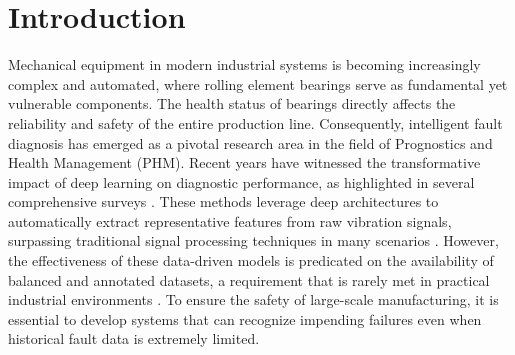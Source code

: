 \begin{abstract}
Rolling element bearings are critical components in industrial machinery, and their failure can lead to catastrophic system breakdowns. While deep learning has significantly advanced fault diagnosis, the performance of these models is often hampered by the class imbalance problem, where fault samples are scarce compared to normal data. To address this challenge, this paper proposes a novel framework termed CAC-CycleGAN-WGP for imbalanced bearing fault diagnosis. The methodological core involves a CycleGAN architecture that transforms normal vibration signals into realistic fault signals, integrated with a Conditional Auxiliary Classifier (CAC) to accurately capture the marginal probability distributions of various fault categories. To ensure training stability and suppress mode collapse, we incorporate Wasserstein distance with a Gradient Penalty (WGP). Furthermore, a quality assessment method based on Stacked Autoencoders (SAE) is developed to evaluate the fidelity of the generated samples. Extensive experiments are conducted on two imbalanced bearing datasets: the Case Western Reserve University (CWRU) dataset and a custom laboratory dataset. Comparative results against state-of-the-art methods, including SMOTE, GAN, WGAN, ACGAN, and ACWGAN-GP, demonstrate that the proposed CAC-CycleGAN-WGP significantly improves diagnostic accuracy and robustness under severe data imbalance, providing a viable solution for real-world industrial health monitoring.
\end{abstract}

\section{Introduction}
\label{sec:intro}

Mechanical equipment in modern industrial systems is becoming increasingly complex and automated, where rolling element bearings serve as fundamental yet vulnerable components. The health status of bearings directly affects the reliability and safety of the entire production line. Consequently, intelligent fault diagnosis has emerged as a pivotal research area in the field of Prognostics and Health Management (PHM). Recent years have witnessed the transformative impact of deep learning on diagnostic performance, as highlighted in several comprehensive surveys \cite{8, Lei2020}. These methods leverage deep architectures to automatically extract representative features from raw vibration signals, surpassing traditional signal processing techniques in many scenarios \cite{32}. However, the effectiveness of these data-driven models is predicated on the availability of balanced and annotated datasets, a requirement that is rarely met in practical industrial environments \cite{40}. To ensure the safety of large-scale manufacturing, it is essential to develop systems that can recognize impending failures even when historical fault data is extremely limited.

